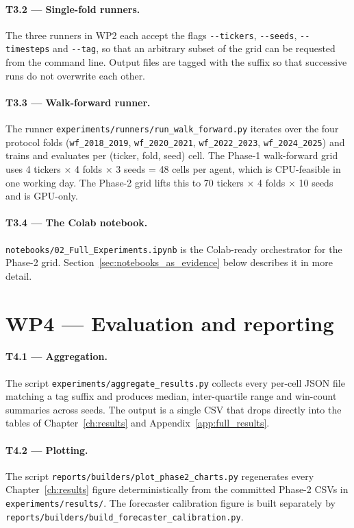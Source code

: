\paragraph{T3.2 --- Single-fold runners.} The three runners in WP2 each accept the flags \texttt{-{}-tickers}, \texttt{-{}-seeds}, \texttt{-{}-timesteps} and \texttt{-{}-tag}, so that an arbitrary subset of the grid can be requested from the command line. Output files are tagged with the suffix so that successive runs do not overwrite each other.

\paragraph{T3.3 --- Walk-forward runner.} The runner \texttt{experiments/runners/run\_walk\_forward.py} iterates over the four protocol folds (\texttt{wf\_2018\_2019}, \texttt{wf\_2020\_2021}, \texttt{wf\_2022\_2023}, \texttt{wf\_2024\_2025}) and trains and evaluates per (ticker, fold, seed) cell. The Phase-1 walk-forward grid uses 4 tickers $\times$ 4 folds $\times$ 3 seeds = 48 cells per agent, which is CPU-feasible in one working day. The Phase-2 grid lifts this to 70 tickers $\times$ 4 folds $\times$ 10 seeds and is GPU-only.

\paragraph{T3.4 --- The Colab notebook.} \texttt{notebooks/02\_Full\_Experiments.ipynb} is the Colab-ready orchestrator for the Phase-2 grid. Section~\ref{sec:notebooks_as_evidence} below describes it in more detail.

\section{WP4 --- Evaluation and reporting}
\label{sec:wp4}

\paragraph{T4.1 --- Aggregation.} The script \texttt{experiments/aggregate\_results.py} collects every per-cell JSON file matching a tag suffix and produces median, inter-quartile range and win-count summaries across seeds. The output is a single CSV that drops directly into the tables of Chapter~\ref{ch:results} and Appendix~\ref{app:full_results}.

\paragraph{T4.2 --- Plotting.} The script \texttt{reports/builders/plot\_phase2\_charts.py} regenerates every Chapter~\ref{ch:results} figure deterministically from the committed Phase-2 CSVs in \texttt{experiments/results/}. The forecaster calibration figure is built separately by \texttt{reports/builders/build\_forecaster\_calibration.py}.

